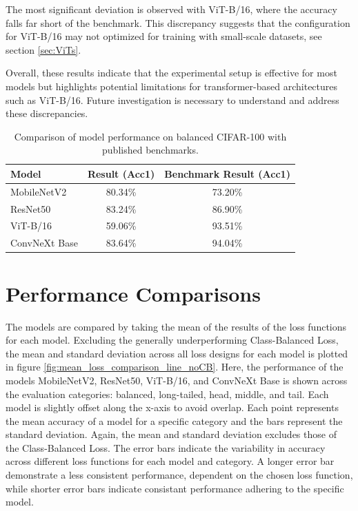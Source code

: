 The most significant deviation is observed with ViT-B/16, where the accuracy falls far short of the benchmark. This discrepancy suggests that the configuration for ViT-B/16 may not optimized for training with small-scale datasets, see section \ref{sec:ViTs}. 

Overall, these results indicate that the experimental setup is effective for most models but highlights potential limitations for transformer-based architectures such as ViT-B/16. Future investigation is necessary to understand and address these discrepancies.

\begin{table}[H]
    \centering
    \caption{Comparison of model performance on balanced CIFAR-100 with published benchmarks.}
    \begin{tabular}{|l|c|c|}
    \hline
    \textbf{Model}        & \textbf{Result (Acc1)} & \textbf{Benchmark Result (Acc1)}  \\ \hline
    MobileNetV2           & 80.34\%               & 73.20\% \cite{park2022bitatneuralnetworkbinarization}  \\ \hline
    ResNet50            & 83.24\%               & 86.90\% \cite{wightman2021resnetstrikesbackimproved}  \\ \hline
    ViT-B/16              & 59.06\%               & 93.51\% \cite{ye2023partialfinetuningsuccessorfinetuning} \\ \hline
    ConvNeXt Base         & 83.64\%               & 94.04\% \cite{ye2023partialfinetuningsuccessorfinetuning}  \\ \hline
    \end{tabular}
    \label{tab:benchmark_comparison}
\end{table}



\section{Performance Comparisons}

The models are compared by taking the mean of the results of the loss functions for each model. Excluding the generally underperforming Class-Balanced Loss, the mean and standard deviation across all loss designs for each model is plotted in figure \ref{fig:mean_loss_comparison_line_noCB}.  Here, the performance of the models MobileNetV2, ResNet50, ViT-B/16, and ConvNeXt Base is shown across the evaluation categories: balanced, long-tailed, head, middle, and tail. Each model is slightly offset along the x-axis to avoid overlap. Each point represents the mean accuracy of a model for a specific category and the bars represent the standard deviation. Again, the mean and standard deviation excludes those of the Class-Balanced Loss. The error bars indicate the variability in accuracy across different loss functions for each model and category. A longer error bar demonstrate a less consistent performance, dependent on the chosen loss function, while shorter error bars indicate consistant performance adhering to the specific model.


